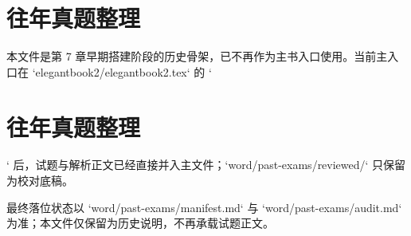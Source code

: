 \chapter{往年真题整理}

本文件是第 7 章早期搭建阶段的历史骨架，已不再作为主书入口使用。当前主入口在 `elegantbook2/elegantbook2.tex` 的 `\chapter{往年真题整理}` 后，试题与解析正文已经直接并入主文件；`word/past-exams/reviewed/` 只保留为校对底稿。

\begin{note}
最终落位状态以 `word/past-exams/manifest.md` 与 `word/past-exams/audit.md` 为准；本文件仅保留为历史说明，不再承载试题正文。
\end{note}
